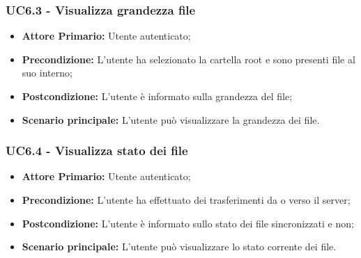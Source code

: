 \subsubsection{UC6.3 - Visualizza grandezza file}
\label{UC6.3}
\begin{itemize}
\item \textbf{Attore Primario:} Utente autenticato;
\item \textbf{Precondizione:} L'utente ha selezionato la cartella root e sono presenti file al suo interno;
\item \textbf{Postcondizione:} L'utente è informato sulla grandezza del file;
\item \textbf{Scenario principale:} L'utente può visualizzare la grandezza dei file.
\end{itemize}

\subsubsection{UC6.4 - Visualizza stato dei file}
\label{UC6.4}
\begin{itemize}
\item \textbf{Attore Primario:} Utente autenticato;
\item \textbf{Precondizione:} L'utente ha effettuato dei trasferimenti da o verso il server;
\item \textbf{Postcondizione:} L'utente è informato sullo stato dei file sincronizzati e non;
\item \textbf{Scenario principale:} L'utente può visualizzare lo stato corrente dei file.
\end{itemize}
